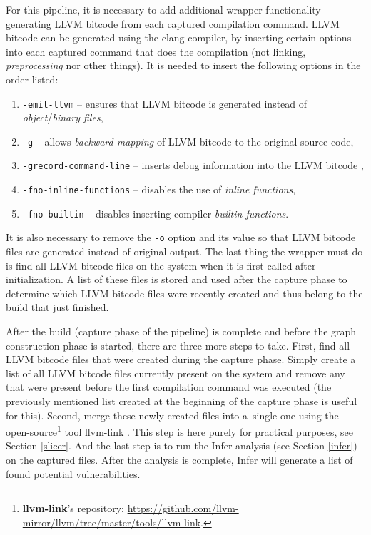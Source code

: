 For this pipeline, it is necessary to add additional wrapper functionality - generating LLVM bitcode from each captured compilation command. LLVM bitcode can be generated using the clang compiler, by inserting certain options into each captured command that does the compilation (not linking, \textit{preprocessing} nor other things). It is needed to insert the following options in the order listed:
\begin{enumerate}
    \item \texttt{-emit-llvm} -- ensures that LLVM bitcode is generated instead of \textit{object}/\textit{binary files},
    \item \texttt{-g} -- allows \textit{backward mapping} of LLVM bitcode to the original source code,
    \item \texttt{-grecord-command-line} -- inserts debug information into the LLVM bitcode \cite{clang-doc},
    \item \texttt{-fno-inline-functions} -- disables the use of \textit{inline functions},
    \item \texttt{-fno-builtin} -- disables inserting compiler \textit{builtin functions}.
\end{enumerate}

It is also necessary to remove the \texttt{-o} option and its value so that LLVM bitcode files are generated instead of original output. The last thing the wrapper must do is find all LLVM bitcode files on the system when it is first called after initialization. A list of these files is stored and used after the capture phase to determine which LLVM bitcode files were recently created and thus belong to the build that just finished.

After the build (capture phase of the pipeline) is complete and before the graph construction phase is started, there are three more steps to take. First, find all LLVM bitcode files that were created during the capture phase. Simply create a list of all LLVM bitcode files currently present on the system and remove any that were present before the first compilation command was executed (the previously mentioned list created at the beginning of the capture phase is useful for this). Second, merge these newly created files into a~single one using the open-source\footnote{\textbf{llvm-link}'s repository: \url{https://github.com/llvm-mirror/llvm/tree/master/tools/llvm-link}.} tool llvm-link \cite{llvm-link-doc}. This step is here purely for practical purposes, see Section \ref{slicer}. And the last step is to run the Infer analysis (see Section \ref{infer}) on the captured files. After the analysis is complete, Infer will generate a list of found potential vulnerabilities.

